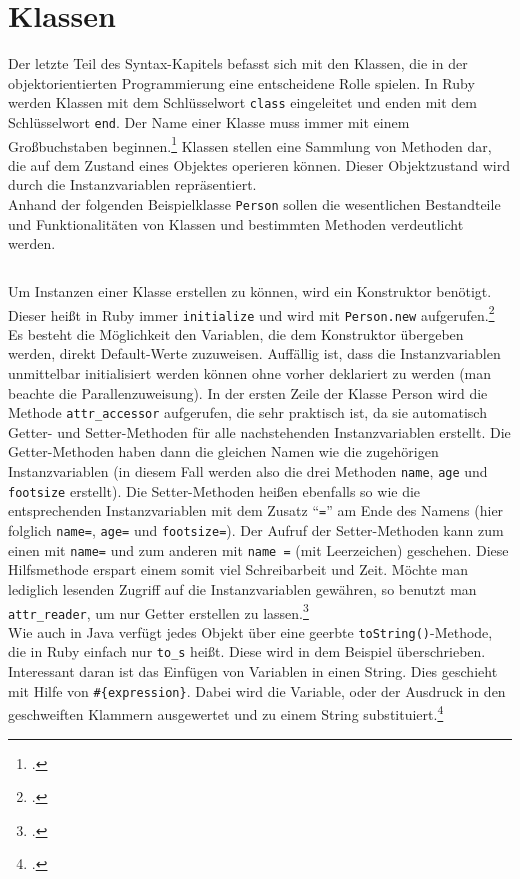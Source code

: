 \documentclass[a4paper, 11pt]{scrreprt}
\begin{document}
\section{Klassen}
Der letzte Teil des Syntax-Kapitels befasst sich mit den Klassen, die in der objektorientierten Programmierung eine entscheidene Rolle spielen.
In Ruby werden Klassen mit dem Schlüsselwort \texttt{class} eingeleitet und enden mit dem Schlüsselwort \texttt{end}. Der Name einer Klasse muss immer mit einem Großbuchstaben beginnen.\footcite[vgl.][S.215]{ruby_lang} Klassen stellen eine Sammlung von Methoden dar, die auf dem Zustand eines Objektes operieren können. Dieser Objektzustand wird durch die Instanzvariablen repräsentiert.
\\
Anhand der folgenden Beispielklasse \texttt{Person} sollen die wesentlichen Bestandteile und Funktionalitäten von Klassen und bestimmten Methoden verdeutlicht werden. 
\inputminted[]{ruby}{person.rb}
Um Instanzen einer Klasse erstellen zu können, wird ein Konstruktor benötigt. Dieser heißt in Ruby immer \texttt{initialize} und wird mit \texttt{Person.new} aufgerufen.\footcite[vgl.][S.215-216]{ruby_lang} Es besteht die Möglichkeit den Variablen, die dem Konstruktor übergeben werden, direkt Default-Werte zuzuweisen. Auffällig ist, dass die Instanzvariablen unmittelbar initialisiert werden können ohne vorher deklariert zu werden (man beachte die Parallenzuweisung). In der ersten Zeile der Klasse Person wird die Methode \texttt{attr\_accessor} aufgerufen, die sehr praktisch ist, da sie automatisch Getter- und Setter-Methoden für alle nachstehenden Instanzvariablen erstellt. Die Getter-Methoden haben dann die gleichen Namen wie die zugehörigen Instanzvariablen (in diesem Fall werden also die drei Methoden \texttt{name}, \texttt{age} und \texttt{footsize} erstellt). Die Setter-Methoden heißen ebenfalls so wie die entsprechenden Instanzvariablen mit dem Zusatz ``\texttt{=}'' am Ende des Namens (hier folglich \texttt{name=}, \texttt{age=} und \texttt{footsize=}). Der Aufruf der Setter-Methoden kann zum einen mit \texttt{name=} und zum anderen mit \texttt{name =} (mit Leerzeichen) geschehen. Diese Hilfsmethode erspart einem somit viel Schreibarbeit und Zeit. Möchte man lediglich lesenden Zugriff auf die Instanzvariablen gewähren, so benutzt man \texttt{attr\_reader}, um nur Getter erstellen zu lassen.\footcite[vgl.][S.218-219]{ruby_lang}\\
Wie auch in Java verfügt jedes Objekt über eine geerbte \texttt{toString()}-Methode, die in Ruby einfach nur \texttt{to\_s} heißt. Diese wird in dem Beispiel überschrieben. Interessant daran ist das Einfügen von Variablen in einen String. Dies geschieht mit Hilfe von \texttt{\#\{expression\}}. Dabei wird die Variable, oder der Ausdruck in den geschweiften Klammern ausgewertet und zu einem String substituiert.\footcite[vgl.][S.90-91]{p_ruby}
\end{document}
